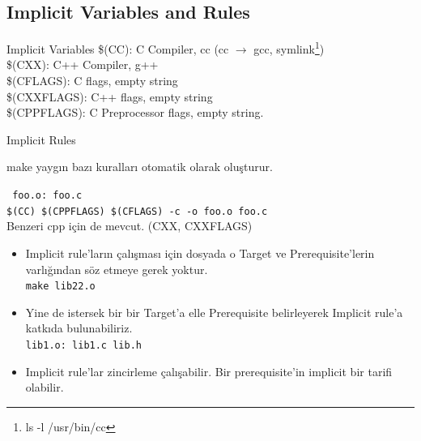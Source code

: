 \documentclass{beamer}
\begin{document}
\subsection{Implicit Variables and Rules}
\begin{frame}
    {Implicit Variables}
    \$(CC): C Compiler, cc (cc $\rightarrow$ gcc, symlink\footnote{ls -l /usr/bin/cc}) \\
    \$(CXX): C++ Compiler, g++ \\
    \$(CFLAGS): C flags, empty string \\
    \$(CXXFLAGS): C++ flags, empty string \\
    \vspace{3mm} 
    \$(CPPFLAGS): C Preprocessor flags, empty string.

\end{frame}

\begin{frame}
    {Implicit Rules}

    make yaygın bazı kuralları otomatik olarak oluşturur.\\
    \vspace{3mm}

    \texttt{%
        foo.o: foo.c \\
        \hspace{10mm}   \$(CC) \$(CPPFLAGS) \$(CFLAGS) -c -o foo.o foo.c\\
        }
        \vspace{3mm}
        Benzeri cpp için de mevcut. (CXX, CXXFLAGS)\\
\end{frame}

\begin{frame}
    \begin{itemize}
    \item Implicit rule'ların çalışması için dosyada o Target ve Prerequisite'lerin varlığından söz etmeye gerek yoktur.\\
        \texttt{make lib22.o}
    \item Yine de istersek bir bir Target'a elle Prerequisite belirleyerek Implicit rule'a katkıda bulunabiliriz.\\
        \texttt{lib1.o: lib1.c lib.h}
    \item Implicit rule'lar zincirleme çalışabilir. Bir prerequisite'in implicit bir tarifi olabilir.
        
    \end{itemize}
\end{frame}
\end{document}
